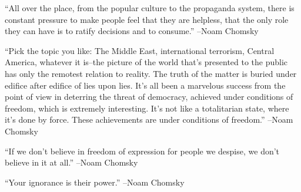 \documentclass{article}%
\begin{document}
\linebreak%
\vspace{1mm}%
\begin{minipage}{\textwidth}%
\flushleft%
“All over the place, from the popular culture to the propaganda system, there is constant pressure to make people feel that they are helpless, that the only role they can have is to ratify decisions and to consume.”%
\linebreak%
\vspace{1mm}%
–Noam Chomsky%
\linebreak%
\vspace{1mm}%
\end{minipage}%
\linebreak%
\vspace{1mm}%
\begin{minipage}{\textwidth}%
\flushleft%
“Pick the topic you like: The Middle East, international terrorism, Central America, whatever it is–the picture of the world that's presented to the public has only the remotest relation to reality. The truth of the matter is buried under edifice after edifice of lies upon lies. It's all been a marvelous success from the point of view in deterring the threat of democracy, achieved under conditions of freedom, which is extremely interesting. It's not like a totalitarian state, where it's done by force. These achievements are under conditions of freedom.”%
\linebreak%
\vspace{1mm}%
–Noam Chomsky%
\linebreak%
\vspace{1mm}%
\end{minipage}%
\linebreak%
\vspace{1mm}%
\begin{minipage}{\textwidth}%
\flushleft%
“If we don't believe in freedom of expression for people we despise, we don't believe in it at all.”%
\linebreak%
\vspace{1mm}%
–Noam Chomsky%
\linebreak%
\vspace{1mm}%
\end{minipage}%
\linebreak%
\vspace{1mm}%
\begin{minipage}{\textwidth}%
\flushleft%
“Your ignorance is their power.”%
\linebreak%
\vspace{1mm}%
–Noam Chomsky%
\linebreak%
\vspace{1mm}%
\end{minipage}%
\end{document}

